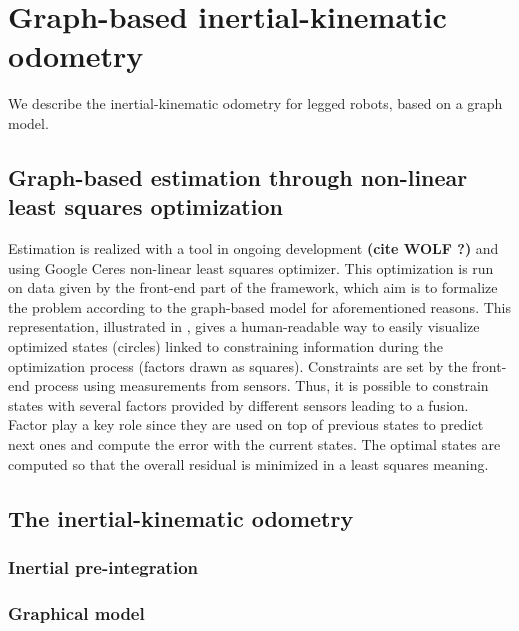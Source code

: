 
\section{Graph-based inertial-kinematic odometry}

We describe the inertial-kinematic odometry for legged robots, based on a graph model. 

\subsection{Graph-based estimation through non-linear least squares optimization}

Estimation is realized with a tool in ongoing development \textbf{(cite WOLF ?)} and using Google Ceres non-linear least squares optimizer. This optimization is run on data given by the front-end part of the framework,
which aim is to formalize the problem according to the graph-based model for aforementioned reasons. This representation, illustrated in , 
gives a human-readable way to easily visualize optimized states (circles) linked to constraining information during the optimization process (factors drawn as squares). Constraints are set by the front-end process using measurements from sensors.
Thus, it is possible to constrain states with several factors provided by different sensors leading to a fusion. Factor play a key role since they are used on top of previous states to predict next ones and compute the error with the current states.
The optimal states are computed so that the overall residual is minimized in a least squares meaning.

\subsection{The inertial-kinematic odometry}
\subsubsection{Inertial pre-integration}
\subsubsection{Graphical model}

